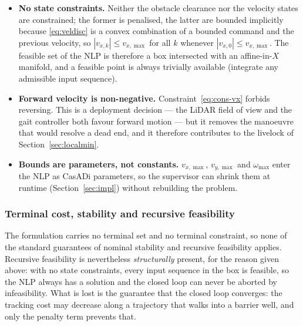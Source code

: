 \documentclass[11pt,a4paper]{article}
\begin{document}
\begin{itemize}
  \item \textbf{No state constraints.} Neither the obstacle clearance nor the velocity states are
        constrained; the former is penalised, the latter are bounded implicitly because
        \eqref{eq:veldisc} is a convex combination of a bounded command and the previous velocity, so
        $|v_{x,k}|\le v_{x,\max}$ for all $k$ whenever $|v_{x,0}|\le v_{x,\max}$. The feasible set of the NLP
        is therefore a box intersected with an affine-in-$X$ manifold, and a feasible point is always
        trivially available (integrate any admissible input sequence).
  \item \textbf{Forward velocity is non-negative.} Constraint~\eqref{eq:cons-vx} forbids reversing. This is a
        deployment decision --- the LiDAR field of view and the gait controller both favour forward motion ---
        but it removes the manoeuvre that would resolve a dead end, and it therefore contributes to the
        livelock of Section~\ref{sec:localmin}.
  \item \textbf{Bounds are parameters, not constants.} $v_{x,\max}$, $v_{y,\max}$ and $\omega_{\max}$ enter
        the NLP as CasADi parameters, so the supervisor can shrink them at runtime (Section~\ref{sec:impl})
        without rebuilding the problem.
\end{itemize}

\subsubsection{Terminal cost, stability and recursive feasibility}
\label{sec:terminal}

The formulation carries no terminal set and no terminal constraint, so none of the standard guarantees of
nominal stability and recursive feasibility \cite{mayne2000constrained,chen1998quasi} applies. Recursive
feasibility is nevertheless \emph{structurally} present, for the reason given above: with no state
constraints, every input sequence in the box is feasible, so the NLP always has a solution and the closed loop
can never be aborted by infeasibility. What is lost is the guarantee that the closed loop converges: the
tracking cost may decrease along a trajectory that walks into a barrier well, and only the penalty term
prevents that.
\end{document}
